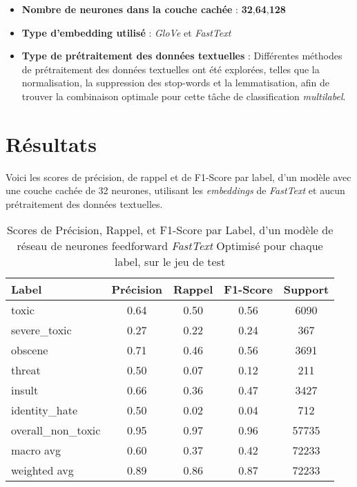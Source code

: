 \begin{itemize}
    \item \textbf{Nombre de neurones dans la couche cachée} : \textbf{32},\textbf{64},\textbf{128}
    \item \textbf{Type d'embedding utilisé} : \textit{GloVe} et \textit{FastText}
    \item \textbf{Type de prétraitement des données textuelles} : Différentes méthodes de prétraitement des données textuelles ont été explorées, telles que la normalisation, la suppression des stop-words et la lemmatisation, afin de trouver la combinaison optimale pour cette tâche de classification \textit{multilabel}.
\end{itemize}


\section{Résultats}

Voici les scores de précision, de rappel et de F1-Score par label, d'un modèle avec une couche cachée de 32 neurones, utilisant les \textit{embeddings} de \textit{FastText} et aucun prétraitement des données textuelles.

\begin{table}[ht]
    \centering
    \caption{Scores de Précision, Rappel, et F1-Score par Label, d'un modèle de réseau de neurones feedforward \textit{FastText} Optimisé pour chaque label, sur le jeu de test}    \begin{tabular}{lcccc}
    \hline
    \textbf{Label} & \textbf{Précision} & \textbf{Rappel} & \textbf{F1-Score} & \textbf{Support} \\ \hline
    toxic          & 0.64               & 0.50            & 0.56              & 6090             \\
    severe\_toxic  & 0.27               & 0.22            & 0.24              & 367              \\
    obscene        & 0.71               & 0.46            & 0.56              & 3691             \\
    threat         & 0.50               & 0.07            & 0.12              & 211              \\
    insult         & 0.66               & 0.36            & 0.47              & 3427             \\
    identity\_hate & 0.50               & 0.02            & 0.04              & 712              \\
    overall\_non\_toxic & 0.95           & 0.97            & 0.96              & 57735            \\\hline
    macro avg      & 0.60              & 0.37            & 0.42              & 72233            \\
    weighted avg   & 0.89               & 0.86            & 0.87              & 72233            \\ \hline
    \end{tabular}
    \label{tab:scores}
\end{table}

